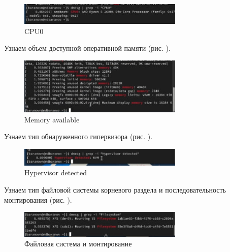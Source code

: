 \documentclass[
  12pt,
  a4paper,
  DIV=11,
  numbers=noendperiod]{scrreprt}
\begin{document}
\begin{figure}

{\centering \includegraphics[width=0.7\textwidth,height=\textheight]{image/10.jpg}

}

\caption{CPU0}

\end{figure}%

Узнаем объем доступной оперативной памяти (рис. \autocite*{fig:011}).

\begin{figure}

{\centering \includegraphics[width=0.7\textwidth,height=\textheight]{image/11.jpg}

}

\caption{Memory available}

\end{figure}%

Узнаем тип обнаруженного гипервизора (рис. \autocite*{fig:012}).

\begin{figure}

{\centering \includegraphics[width=0.7\textwidth,height=\textheight]{image/12.jpg}

}

\caption{Hypervisor detected}

\end{figure}%

Узнаем тип файловой системы корневого раздела и последовательность
монтирования (рис. \autocite*{fig:013}).

\begin{figure}

{\centering \includegraphics[width=0.7\textwidth,height=\textheight]{image/13.jpg}

}

\caption{Файловая система и монтирование}

\end{figure}%
\end{document}
